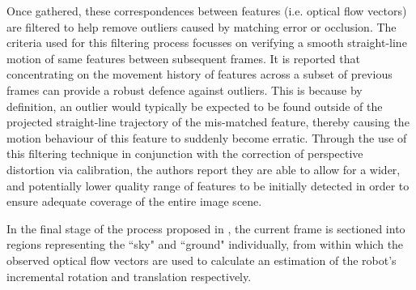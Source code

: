 Once gathered, these correspondences between features (i.e. optical flow vectors) are filtered to help remove outliers caused by matching error or occlusion. The criteria used for this filtering process focusses on verifying a smooth straight-line motion of same features between subsequent frames. It is reported that concentrating on the movement history of features across a subset of previous frames can provide a robust defence against outliers. This is because by definition, an outlier would typically be expected to be found outside of the projected straight-line trajectory of the mis-matched feature, thereby causing the motion behaviour of this feature to suddenly become erratic. Through the use of this filtering technique in conjunction with the correction of perspective distortion via calibration, the authors report they are able to allow for a wider, and potentially lower quality range of features to be initially detected in order to ensure adequate coverage of the entire image scene. 

In the final stage of the process proposed in \cite{campbell}, the current frame is sectioned into regions representing the ``sky" and ``ground" individually, from within which the observed optical flow vectors are used to calculate an estimation of the robot's incremental rotation and translation respectively.


